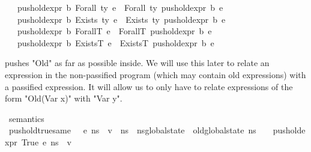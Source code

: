 \begin{isabellebody}
\ \ {\isacharbar}{\kern0pt}\ {\isachardoublequoteopen}push{\isacharunderscore}{\kern0pt}old{\isacharunderscore}{\kern0pt}expr\ b\ {\isacharparenleft}{\kern0pt}Forall\ ty\ e{\isacharparenright}{\kern0pt}\ {\isacharequal}{\kern0pt}\ Forall\ ty\ {\isacharparenleft}{\kern0pt}push{\isacharunderscore}{\kern0pt}old{\isacharunderscore}{\kern0pt}expr\ b\ e{\isacharparenright}{\kern0pt}{\isachardoublequoteclose}\isanewline
\ \ {\isacharbar}{\kern0pt}\ {\isachardoublequoteopen}push{\isacharunderscore}{\kern0pt}old{\isacharunderscore}{\kern0pt}expr\ b\ {\isacharparenleft}{\kern0pt}Exists\ ty\ e{\isacharparenright}{\kern0pt}\ {\isacharequal}{\kern0pt}\ Exists\ ty\ {\isacharparenleft}{\kern0pt}push{\isacharunderscore}{\kern0pt}old{\isacharunderscore}{\kern0pt}expr\ b\ e{\isacharparenright}{\kern0pt}{\isachardoublequoteclose}\isanewline
\ \ {\isacharbar}{\kern0pt}\ {\isachardoublequoteopen}push{\isacharunderscore}{\kern0pt}old{\isacharunderscore}{\kern0pt}expr\ b\ {\isacharparenleft}{\kern0pt}ForallT\ e{\isacharparenright}{\kern0pt}\ {\isacharequal}{\kern0pt}\ ForallT\ {\isacharparenleft}{\kern0pt}push{\isacharunderscore}{\kern0pt}old{\isacharunderscore}{\kern0pt}expr\ b\ e{\isacharparenright}{\kern0pt}{\isachardoublequoteclose}\isanewline
\ \ {\isacharbar}{\kern0pt}\ {\isachardoublequoteopen}push{\isacharunderscore}{\kern0pt}old{\isacharunderscore}{\kern0pt}expr\ b\ {\isacharparenleft}{\kern0pt}ExistsT\ e{\isacharparenright}{\kern0pt}\ {\isacharequal}{\kern0pt}\ ExistsT\ {\isacharparenleft}{\kern0pt}push{\isacharunderscore}{\kern0pt}old{\isacharunderscore}{\kern0pt}expr\ b\ e{\isacharparenright}{\kern0pt}{\isachardoublequoteclose}%
\begin{isamarkuptext}%
 pushes "Old" as far as possible inside. We will use this later to relate an
expression in the non-passified program (which may contain old expressions) with a passified expression.
It will allow us to only have to relate expressions of the form "Old(Var x)" with "Var y".%
\end{isamarkuptext}\isamarkuptrue%
\isamarkupfalse%
\ semantics\ \isanewline
\isanewline
{}\isamarkupfalse%
\ push{\isacharunderscore}{\kern0pt}old{\isacharunderscore}{\kern0pt}true{\isacharunderscore}{\kern0pt}same{\isacharcolon}{\kern0pt}\ {\isachardoublequoteopen}{\isasymLambda}{\isacharcomma}{\kern0pt}{\isasymGamma}{\isacharcomma}{\kern0pt}{\isasymOmega}\ {\isasymturnstile}\ {\isasymlangle}e{\isacharcomma}{\kern0pt}\ ns{\isasymrangle}\ {\isasymDown}\ v\ {\isasymLongrightarrow}\ ns\ {\isacharequal}{\kern0pt}\ ns{\isacharprime}{\kern0pt}{\isasymlparr}global{\isacharunderscore}{\kern0pt}state\ {\isacharcolon}{\kern0pt}{\isacharequal}{\kern0pt}\ old{\isacharunderscore}{\kern0pt}global{\isacharunderscore}{\kern0pt}state\ ns{\isacharprime}{\kern0pt}{\isasymrparr}\ {\isasymLongrightarrow}\ {\isasymLambda}{\isacharcomma}{\kern0pt}{\isasymGamma}{\isacharcomma}{\kern0pt}{\isasymOmega}\ {\isasymturnstile}\ {\isasymlangle}push{\isacharunderscore}{\kern0pt}old{\isacharunderscore}{\kern0pt}expr\ True\ e{\isacharcomma}{\kern0pt}\ ns{\isacharprime}{\kern0pt}{\isasymrangle}\ {\isasymDown}\ v{\isachardoublequoteclose}\isanewline

\end{isabellebody}
